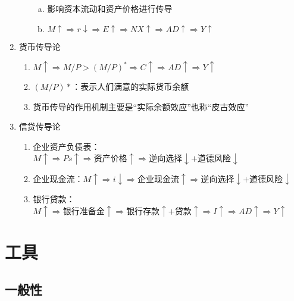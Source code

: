 \documentclass[12pt]{book}
\begin{document}
\begin{enumerate}[1.]
\begin{enumerate}[(1)]
\begin{enumerate}[a.]
                  \item 影响资本流动和资产价格进行传导
                  \item $M\uparrow\Rightarrow r\downarrow \Rightarrow E\uparrow \Rightarrow NX\uparrow \Rightarrow AD\uparrow\Rightarrow Y\uparrow $
                \end{enumerate}
        \end{enumerate}
  \item 货币传导论	
        \begin{enumerate}[(1)]
          \item $ M\uparrow \Rightarrow M/P>(M/P)^*\Rightarrow C\uparrow \Rightarrow AD\uparrow\Rightarrow Y\uparrow $
          \item $(M/P)*$：表示人们满意的实际货币余额
          \item 货币传导的作用机制主要是“实际余额效应”也称“皮古效应”
        \end{enumerate}
  \item 信贷传导论
        \begin{enumerate}[(1)]
          \item 企业资产负债表：$M\uparrow \Rightarrow Ps\uparrow \Rightarrow \text{资产价格}\uparrow \Rightarrow \text{逆向选择}\downarrow +\text{道德风险}\downarrow $
          \item 企业现金流：$M\uparrow \Rightarrow i\downarrow \Rightarrow \text{企业现金流}\uparrow\Rightarrow \text{逆向选择}\downarrow +\text{道德风险}\downarrow $
          \item 银行贷款：$M\uparrow \Rightarrow \text{银行准备金}\uparrow \Rightarrow \text{银行存款}\uparrow +\text{贷款}\uparrow \Rightarrow I\uparrow \Rightarrow AD\uparrow\Rightarrow Y\uparrow$
        \end{enumerate}
\end{enumerate}













\section{工具}

\subsection{一般性}
\end{document}
